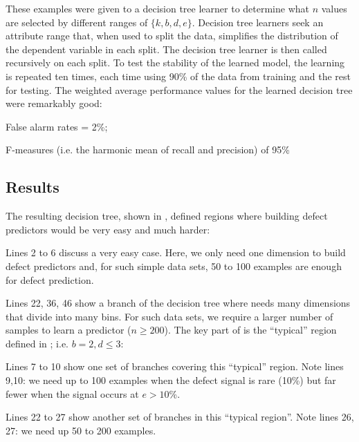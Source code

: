     These examples were given to a decision tree learner to determine what $n$ values are selected by different
    ranges of $\{k,b,d,e\}$. Decision tree learners seek an attribute range that, when used to split the data,
      simplifies the distribution of the dependent variable in each split.
      The decision tree learner is then called recursively on each split.
      To test the stability of the learned model, the learning is repeated ten times, each time using 90\% of the data from training and the rest
      for testing. The weighted average performance values for the learned decision tree were remarkably good:
      \bi
    \item False alarm rates = 2\%;
    \item F-measures (i.e. the harmonic mean of recall and precision) of 95\%
      \ei
\subsection{Results}

The resulting decision tree, shown in , defined regions where
building defect predictors would be very easy and much harder:
\bi
\item
Lines 2 to 6 discuss a very easy case. Here, we only need
one dimension to build defect predictors and,
for such simple data sets, 50 to 100 examples are enough for defect prediction.
\item
Lines 22, 36, 46 show a branch of the decision tree
where needs many dimensions that divide into many bins.
For such data sets, we require a larger number of samples to learn a predictor ($n \ge 200$).
\ei
The key part of  is the ``typical'' region defined in ;
i.e.    $b=2, d \le 3$:
\bi
\item Lines 7 to 10 show one set of branches covering this ``typical'' region. Note
lines 9,10:  we need up to 100 examples when the defect signal is rare (10\%) but
far fewer when the signal occurs at $e>10$\%.
\item
Lines 22 to 27 show another set of branches in this ``typical region''. Note lines 26, 27:
we need up 50 to 200 examples.
\ei
